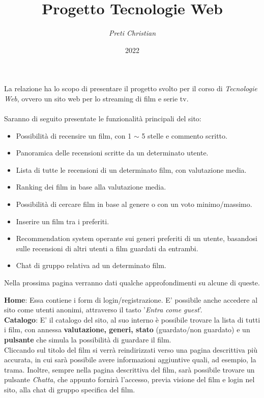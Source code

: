 \documentclass[12pt]{article}
\begin{document}
 \noindent
	\title{\Huge \textbf{Progetto Tecnologie Web}}
	\author{\textit{Preti Christian}}
	\date{2022}
	\maketitle 
	\noindent La relazione ha lo scopo di presentare il progetto svolto per il corso di \textit{Tecnologie Web}, ovvero un sito web per lo streaming di film e serie tv. \\ \\
	
	\noindent Saranno di seguito presentate le funzionalità principali del sito: \\
	\begin{itemize}
		\item Possibilità di recensire un film, con 1 $\sim$ 5 stelle e commento scritto.
		\item Panoramica delle recensioni scritte da un determinato utente.
		\item Lista di tutte le recensioni di un determinato film, con valutazione media.
		\item Ranking dei film in base alla valutazione media.
		\item Possibilità di cercare film in base al genere o con un voto minimo/massimo.
		\item Inserire un film tra i preferiti.
		\item Recommendation system operante sui generi preferiti di un utente, basandosi sulle recensioni di altri utenti a film guardati da entrambi.
		\item Chat di gruppo relativa ad un determinato film. \\
	\end{itemize}
	
	\noindent Nella prossima pagina verranno dati qualche approfondimenti su alcune di queste. 
	\pagebreak
	
	
	
	
	\noindent \textbf{Home}: Essa contiene i form di login/registrazione. E' possibile anche accedere al sito come utenti anonimi, attraverso il tasto '\textit{Entra come guest}'. \\
	
	\noindent \textbf{Catalogo}: E' il catalogo del sito, al suo interno è possibile trovare la lista di tutti i film, con annessa \textbf{valutazione, generi, stato} (guardato/non guardato) e un \textbf{pulsante} che simula la possibilità di guardare il film. \\
	Cliccando sul titolo del film si verrà reindirizzati verso una pagina descrittiva più accurata, in cui sarà possibile avere informazioni aggiuntive quali, ad esempio, la trama. Inoltre, sempre nella pagina descrittiva del film, sarà possibile trovare un pulsante \textit{Chatta}, che appunto fornirà l'accesso, previa visione del film e login nel sito, alla chat di gruppo specifica del film. \\
	
\end{document}
